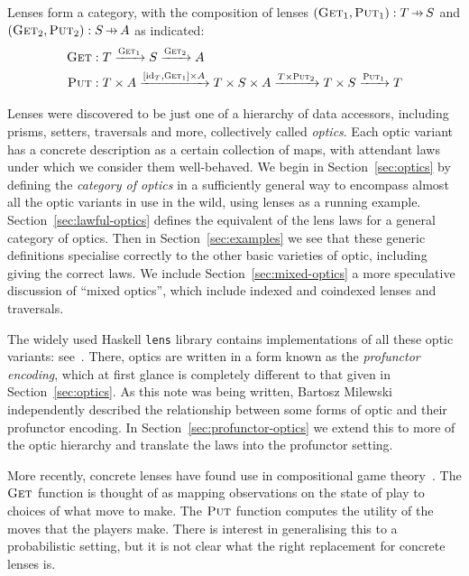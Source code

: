 \documentclass[11pt,letterpaper]{article}
\theoremstyle{plain}
\theoremstyle{definition}
\newcommand{\lenslib}{\texttt{lens}}
\newcommand{\id}{\mathrm{id}}
\newcommand{\fget}{\textsc{Get}}
\newcommand{\fput}{\textsc{Put}}
\newcommand{\hto}{\ensuremath{\,\mathaccent\shortmid\rightarrow\,}}
\newcommand{\todo}[1]{\textcolor{red}{\small #1}}
\begin{document}
Lenses form a category, with the composition of lenses $(\fget_1, \fput_1) : T \hto S$ and $(\fget_2, \fput_2) : S \hto A$ as indicated:
\begin{align*}
\fget &: T \xrightarrow{\fget_1} S \xrightarrow{\fget_2} A \\
\fput &: T \times A \xrightarrow{[\id_T, \fget_1] \times A} T \times S \times A \xrightarrow{T \times \fput_2} T \times S \xrightarrow{\fput_1} T
\end{align*}

Lenses were discovered to be just one of a hierarchy of data accessors, including prisms, setters, traversals and more, collectively called \emph{optics}. Each optic variant has a concrete description as a certain collection of maps, with attendant laws under which we consider them well-behaved. We begin in Section~\ref{sec:optics} by defining the \emph{category of optics} in a sufficiently general way to encompass almost all the optic variants in use in the wild, using lenses as a running example. Section~\ref{sec:lawful-optics} defines the equivalent of the lens laws for a general category of optics. Then in Section~\ref{sec:examples} we see that these generic definitions specialise correctly to the other basic varieties of optic, including giving the correct laws. We include Section~\ref{sec:mixed-optics} a more speculative discussion of ``mixed optics'', which include indexed and coindexed lenses and traversals.

The widely used Haskell \lenslib{} library contains implementations of all these optic variants: see~\cite{LensLibrary}. There, optics are written in a form known as the \emph{profunctor encoding}, which at first glance is completely different to that given in Section~\ref{sec:optics}. As this note was being written, Bartosz Milewski~\cite{ProfunctorOpticsPost} independently described the relationship between some forms of optic and their profunctor encoding. In Section~\ref{sec:profunctor-optics} we extend this to more of the optic hierarchy and translate the laws into the profunctor setting.

More recently, concrete lenses have found use in compositional game theory~\cite{CompositionalGameTheory}. The $\fget$ function is thought of as mapping observations on the state of play to choices of what move to make. The $\fput$ function computes the utility of the moves that the players make. There is interest in generalising this to a probabilistic setting, but it is not clear what the right replacement for concrete lenses is.
\end{document}
